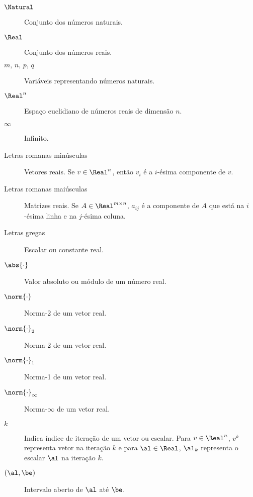 
\begin{description}

	    \item[$\Natural$] Conjunto dos números naturais.

    \item[$\Real$] Conjunto dos números reais.

    \item[$m,\, n,\, p,\, q$] Variáveis representando números naturais.

    \item[$\Real^n$] Espaço euclidiano de  números reais de dimensão $n$.

    \item[$\infty$] Infinito.


     \item[Letras romanas minúsculas] Vetores reais. Se $v\in\Real^{n}$, então $v_{i}$ é a $i$-ésima componente de $v$.

    \item[Letras romanas maiúsculas] Matrizes reais. Se $A\in\Real^{m\times n}$, $a_{ij}$ é a componente de $A$ que está na $i$-ésima linha e na $j$-ésima coluna.

    \item[Letras gregas] Escalar ou constante real.


    \item[$\abs{\cdot}$] Valor absoluto ou módulo de um número  real. 
    \item[$\norm{\cdot}$] Norma-2 de um vetor real.

    \item[$\norm{\cdot}_{2}$] Norma-2 de um vetor real.

    \item[$\norm{\cdot}_{1}$] Norma-1 de um vetor real.

    \item[$\norm{\cdot}_{\infty}$] Norma-$\infty$ de um vetor real.

    \item[$k$] Indica índice de iteração de um vetor ou escalar.  Para $v\in\Real^{n}$, $v^{k}$ representa vetor na iteração $k$ e para $\al\in\Real$, $\al_{k}$ representa o escalar $\al$ na iteração $k$. 



    \item[$(\al, \be)$] Intervalo aberto de $\al$ até $\be$.


\end{description}
